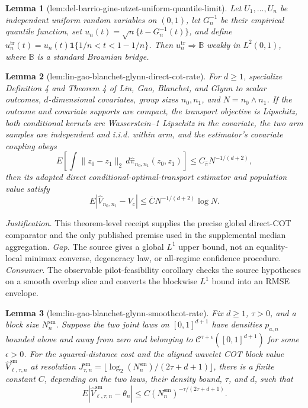 \documentclass{article}
\newtheorem{lemma}{Lemma}
\begin{document}
\begin{lemma}[lem:del-barrio-gine-utzet-uniform-quantile-limit]\label{lem:del-barrio-gine-utzet-uniform-quantile-limit}
Let \(U_1,\ldots,U_n\) be independent uniform random variables on \((0,1)\), let \(G_n^{-1}\) be their empirical quantile function, set \(u_n(t)=\sqrt n\{t-G_n^{-1}(t)\}\), and define \(u_n^{\mathrm{tr}}(t)=u_n(t)\mathbf 1\{1/n<t<1-1/n\}\).  Then \(u_n^{\mathrm{tr}}\Rightarrow\mathbb B\) weakly in \(L^2(0,1)\), where \(\mathbb B\) is a standard Brownian bridge.
\end{lemma}

\begin{lemma}[lem:lin-gao-blanchet-glynn-direct-cot-rate]\label{lem:lin-gao-blanchet-glynn-direct-cot-rate}
For \(d\ge1\), specialize Definition 4 and Theorem 4 of Lin, Gao, Blanchet, and Glynn to scalar outcomes, \(d\)-dimensional covariates, group sizes \(n_0,n_1\), and \(N=n_0\wedge n_1\).  If the outcome and covariate supports are compact, the transport objective is Lipschitz, both conditional kernels are Wasserstein--1 Lipschitz in the covariate, the two arm samples are independent and i.i.d. within arm, and the estimator's covariate coupling obeys
\[
E\!\left[\int\|z_0-z_1\|_2\,d\widehat\pi_{n_0,n_1}(z_0,z_1)\right]\le C_{\widehat\pi}N^{-1/(d+2)},
\]
then its adapted direct conditional-optimal-transport estimator and population value satisfy
\[
E|\widehat V_{n_0,n_1}-V_{\mathrm c}|\le \overline C N^{-1/(d+2)}\log N.
\]
\end{lemma}
\par\smallskip\noindent \textit{Justification.} This theorem-level receipt supplies the precise global direct-COT comparator and the only published premise used in the supplemental median aggregation. \textit{Gap.} The source gives a global \(L^1\) upper bound, not an equality-local minimax converse, degeneracy law, or all-regime confidence procedure. \textit{Consumer.} The observable pilot-feasibility corollary checks the source hypotheses on a smooth overlap slice and converts the blockwise \(L^1\) bound into an RMSE envelope.

\begin{lemma}[lem:lin-gao-blanchet-glynn-smoothcot-rate]\label{lem:lin-gao-blanchet-glynn-smoothcot-rate}
Fix \(d\ge1\), \(\tau>0\), and a block size \(N_n^{\mathrm{sm}}\). Suppose the two joint laws on \([0,1]^{d+1}\) have densities \(p_{a,n}\) bounded above and away from zero and belonging to \(\mathcal C^{\tau+\epsilon}([0,1]^{d+1})\) for some \(\epsilon>0\). For the squared-distance cost and the aligned wavelet COT block value \(\widehat V_{\ell,\tau,n}^{\mathrm{sm}}\) at resolution \(J_{\tau,n}^{\mathrm{sm}}=\lfloor\log_2(N_n^{\mathrm{sm}})/(2\tau+d+1)\rfloor\), there is a finite constant \(C\), depending on the two laws, their density bound, \(\tau\), and \(d\), such that
\[
E\left|\widehat V_{\ell,\tau,n}^{\mathrm{sm}}-\theta_n\right|
\le C(N_n^{\mathrm{sm}})^{-\tau/(2\tau+d+1)}.
\]
\end{lemma}
\end{document}
